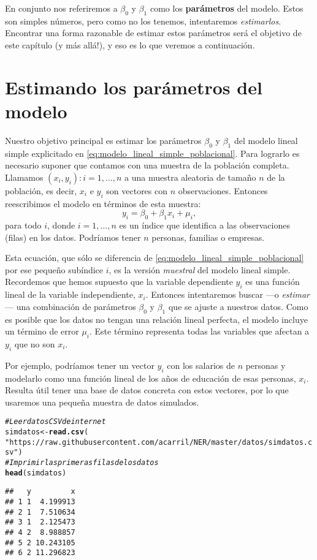 \documentclass{report}\usepackage[]{graphicx}\usepackage[]{color}
\makeatletter
\newcommand{\hlstr}[1]{\textcolor[rgb]{0.192,0.494,0.8}{#1}}%
\newcommand{\hlcom}[1]{\textcolor[rgb]{0.678,0.584,0.686}{\textit{#1}}}%
\newcommand{\hlstd}[1]{\textcolor[rgb]{0.345,0.345,0.345}{#1}}%
\newcommand{\hlkwb}[1]{\textcolor[rgb]{0.69,0.353,0.396}{#1}}%
\newcommand{\hlkwd}[1]{\textcolor[rgb]{0.737,0.353,0.396}{\textbf{#1}}}%
\newenvironment{kframe}{%
 \def\at@end@of@kframe{}%
 \ifinner\ifhmode%
  \def\at@end@of@kframe{\end{minipage}}%
  \begin{minipage}{\columnwidth}%
 \fi\fi%
 \def\FrameCommand##1{\hskip\@totalleftmargin \hskip-\fboxsep
 \colorbox{shadecolor}{##1}\hskip-\fboxsep
     \hskip-\linewidth \hskip-\@totalleftmargin \hskip\columnwidth}%
 \MakeFramed {\advance\hsize-\width
   \@totalleftmargin\z@ \linewidth\hsize
   \@setminipage}}%
 {\par\unskip\endMakeFramed%
 \at@end@of@kframe}
\newenvironment{knitrout}{}{} %
\newcommand*{\kw}[1]{\textbf{#1}\index{#1}}
\makeatother
\begin{document}
En conjunto nos referiremos a $\beta_0$ y $\beta_1$ como los \kw{parámetros} del modelo. Estos son simples números, pero como no los tenemos, intentaremos \emph{estimarlos}.
Encontrar una forma razonable de estimar estos parámetros será el objetivo de este capítulo (y más allá!), y eso es lo que veremos a continuación.

\section{Estimando los parámetros del modelo}

Nuestro objetivo principal es estimar los parámetros $\beta_0$ y $\beta_1$ del modelo lineal simple explicitado en \eqref{eq:modelo_lineal_simple_poblacional}. Para lograrlo es necesario suponer que contamos con una muestra de la población completa. Llamamos ${(x_i, y_i): i = 1, \ldots, n}$ a una muestra aleatoria de tamaño $n$ de la población, es decir, $x_i$ e $y_i$ son vectores con $n$ observaciones. Entonces reescribimos el modelo en términos de esta muestra:
\begin{equation}
y_i = \beta_0 + \beta_1 x_i + \mu_i,
\label{eq:modelo_lineal_simple}
\end{equation}
para todo $i$, donde $i = 1, \ldots, n$ es un índice que identifica a las observaciones (filas) en los datos. Podríamos tener $n$ personas, familias o empresas.

Esta ecuación, que sólo se diferencia de \eqref{eq:modelo_lineal_simple_poblacional} por ese pequeño subíndice $i$, es la versión \emph{muestral} del modelo lineal simple.
Recordemos que hemos supuesto que la variable dependiente $y_i$ es una función lineal de la variable independiente, $x_i$.
Entonces intentaremos buscar ---o \emph{estimar}--- una combinación de parámetros $\beta_0$ y $\beta_1$ que se ajuste a nuestros datos. Como es posible que los datos no tengan una relación lineal perfecta, el modelo incluye un término de error $\mu_i$. Este término representa todas las variables que afectan a $y_i$ que no son $x_i$.

Por ejemplo, podríamos tener un vector $y_i$ con los salarios de $n$ personas y modelarlo como una función lineal de los años de educación de esas personas, $x_i$. Resulta útil tener una base de datos concreta con estos vectores, por lo que usaremos una pequeña muestra de datos simulados.

\begin{knitrout}
\color{fgcolor}\begin{kframe}
\begin{alltt}
\hlcom{# Leer datos CSV de internet}
\hlstd{simdatos} \hlkwb{<-} \hlkwd{read.csv}\hlstd{(}
  \hlstr{"https://raw.githubusercontent.com/acarril/NER/master/datos/simdatos.csv"}\hlstd{)}
\hlcom{# Imprimir las primeras filas de los datos}
\hlkwd{head}\hlstd{(simdatos)}
\end{alltt}
\begin{verbatim}
##   y         x
## 1 1  4.199913
## 2 1  7.510634
## 3 1  2.125473
## 4 2  8.988857
## 5 2 10.243105
## 6 2 11.296823
\end{verbatim}
\end{kframe}
\end{knitrout}
\end{document}

